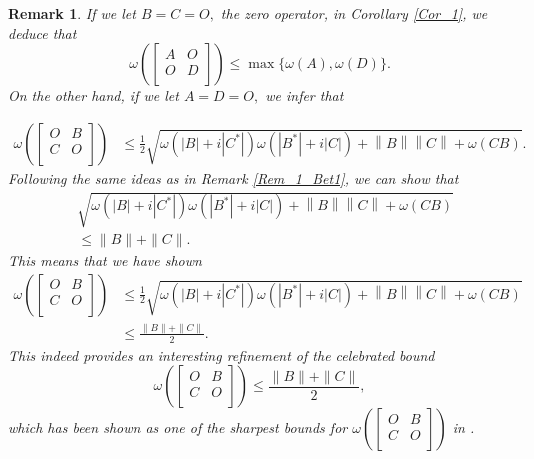 \documentclass[12pt,twoside,reqno]{amsart}
\newtheorem{remark}{Remark}[section]
\numberwithin{equation}{section}
\begin{document}
\begin{remark}
If we let $B=C=O,$ the zero operator, in Corollary \ref{Cor_1}, we deduce that 
\[\omega \left( \left[ \begin{matrix}
   A & O  \\
   O & D  \\
\end{matrix} \right] \right)\le\max\{\omega(A),\omega(D)\}.\]
On the other hand, if we let $A=D=O,$ we infer that

\begin{equation}\label{Eq_Ned_op1}
\begin{aligned}
   \omega \left( \left[ \begin{matrix}
   O & B  \\
   C & O  \\
\end{matrix} \right] \right)&\le \frac{1}{2}\sqrt{\omega \left( \left| B \right|+i\left| {{C}^{*}} \right| \right)\omega \left( \left| {{B}^{*}} \right|+i\left| C \right| \right)+\left\| B \right\|\left\| C \right\|+\omega \left( CB \right)}.  
\end{aligned}
\end{equation}
 Following the same ideas as in Remark \ref{Rem_1_Bet1}, we can show that
\[\begin{aligned}
&\sqrt{\omega \left( \left| B \right|+i\left| {{C}^{*}} \right| \right)\omega \left( \left| {{B}^{*}} \right|+i\left| C \right| \right)+\left\| B \right\|\left\| C \right\|+\omega \left( CB \right)}\\
&\leq \|B\|+\|C\|.
\end{aligned}
\]
This means that we have shown
\[
\begin{aligned}
\omega \left( \left[ \begin{matrix}
   O & B  \\
   C & O  \\
\end{matrix} \right] \right)&\le \frac{1}{2}\sqrt{\omega \left( \left| B \right|+i\left| {{C}^{*}} \right| \right)\omega \left( \left| {{B}^{*}} \right|+i\left| C \right| \right)+\left\| B \right\|\left\| C \right\|+\omega \left( CB \right)}\\
&\leq\frac{\|B\|+\|C\|}{2}.
\end{aligned}
\]
This indeed provides an interesting refinement of the celebrated bound
\[\omega \left( \left[ \begin{matrix}
   O & B  \\
   C & O  \\
\end{matrix} \right] \right)\le\frac{\|B\|+\|C\|}{2},\]
which has been shown as one of the sharpest bounds for $\omega \left( \left[ \begin{matrix}
   O & B  \\
   C & O  \\
\end{matrix} \right] \right)$ in \cite{Hirzallah_IEOT_2011}. 
\end{remark}
\end{document}
